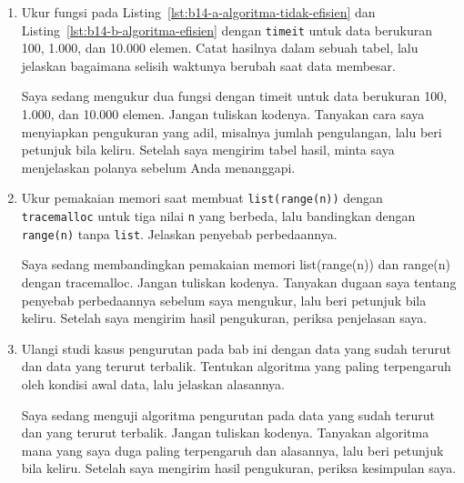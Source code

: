\begin{enumerate}
  \item Ukur fungsi pada Listing~\ref{lst:b14-a-algoritma-tidak-efisien} dan Listing~\ref{lst:b14-b-algoritma-efisien} dengan \texttt{timeit} untuk data berukuran 100, 1.000, dan 10.000 elemen. Catat hasilnya dalam sebuah tabel, lalu jelaskan bagaimana selisih waktunya berubah saat data membesar.
    \begin{promptterarah}
    Saya sedang mengukur dua fungsi dengan timeit untuk data berukuran 100, 1.000, dan 10.000 elemen. Jangan tuliskan kodenya. Tanyakan cara saya menyiapkan pengukuran yang adil, misalnya jumlah pengulangan, lalu beri petunjuk bila keliru. Setelah saya mengirim tabel hasil, minta saya menjelaskan polanya sebelum Anda menanggapi.
    \end{promptterarah}
  \item Ukur pemakaian memori saat membuat \texttt{list(range(n))} dengan \texttt{tracemalloc} untuk tiga nilai \texttt{n} yang berbeda, lalu bandingkan dengan \texttt{range(n)} tanpa \texttt{list}. Jelaskan penyebab perbedaannya.
    \begin{promptterarah}
    Saya sedang membandingkan pemakaian memori list(range(n)) dan range(n) dengan tracemalloc. Jangan tuliskan kodenya. Tanyakan dugaan saya tentang penyebab perbedaannya sebelum saya mengukur, lalu beri petunjuk bila keliru. Setelah saya mengirim hasil pengukuran, periksa penjelasan saya.
    \end{promptterarah}
  \item Ulangi studi kasus pengurutan pada bab ini dengan data yang sudah terurut dan data yang terurut terbalik. Tentukan algoritma yang paling terpengaruh oleh kondisi awal data, lalu jelaskan alasannya.
  \begin{promptterarah}
  Saya sedang menguji algoritma pengurutan pada data yang sudah terurut dan yang terurut terbalik. Jangan tuliskan kodenya. Tanyakan algoritma mana yang saya duga paling terpengaruh dan alasannya, lalu beri petunjuk bila keliru. Setelah saya mengirim hasil pengukuran, periksa kesimpulan saya.
  \end{promptterarah}
\end{enumerate}

